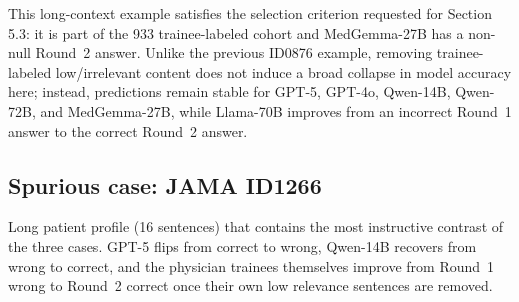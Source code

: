 \documentclass[11pt]{article}
\begin{document}
\noindent This long-context example satisfies the selection criterion requested for Section 5.3: it is part of the 933 trainee-labeled cohort and MedGemma-27B has a non-null Round~2 answer. Unlike the previous ID0876 example, removing trainee-labeled low/irrelevant content does not induce a broad collapse in model accuracy here; instead, predictions remain stable for GPT-5, GPT-4o, Qwen-14B, Qwen-72B, and MedGemma-27B, while Llama-70B improves from an incorrect Round~1 answer to the correct Round~2 answer.


\subsection{Spurious case: JAMA ID1266}
\label{sample:jama_id1266}

Long patient profile (16 sentences) that contains the most instructive contrast of the three cases. GPT-5 flips from correct to wrong, Qwen-14B recovers from wrong to correct, and the physician trainees themselves improve from Round~1 wrong to Round~2 correct once their own low relevance sentences are removed.
\end{document}
